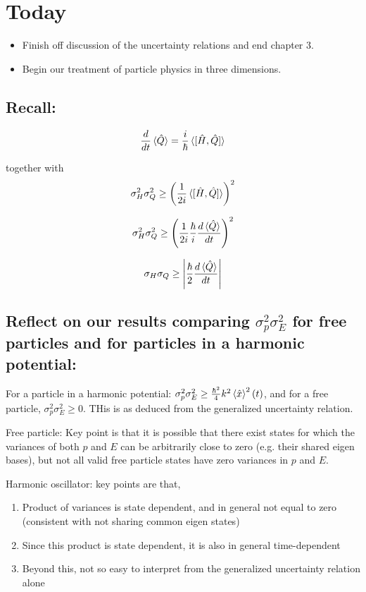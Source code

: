 \documentclass{article}
\begin{document}
\section{Today}

\begin{itemize}
    \item Finish off discussion of the uncertainty relations and end chapter 3. 
    \item Begin our treatment of particle physics in three dimensions. 
\end{itemize}

\hfill

\subsection*{Recall:}

$$\frac{d}{dt} \braket{\hat{Q}} = \frac{i}{\hbar} \braket{[\hat{H}, \hat{Q}]}$$

together with $$\sigma_H^2 \sigma_Q^2 \geq \left( \frac{1}{2i} \braket{[\hat{H}, \hat{Q}]} \right)^2$$

$$\sigma_H^2 \sigma_Q^2 \geq \left( \frac{1}{2i} \frac{\hbar}{i} \frac{d \braket{\hat{Q}}}{dt} \right)^2$$

$$\sigma_H \sigma_Q \geq \left|  \frac{\hbar}{2} \frac{d \braket{\hat{Q}}}{dt} \right|$$

\subsection*{Reflect on our results comparing $\sigma_p^2 \sigma_E^2$  for free particles and for particles in a harmonic potential:}

For a particle in a harmonic potential: $\sigma_p^2 \sigma_E^2 \geq \frac{\hbar^2}{4} k^2 \braket{\hat{x}}^2 (t)$, and for a free particle, $\sigma_p^2 \sigma_E^2 \geq 0$. THis is as deduced from the generalized uncertainty relation. 


Free particle: Key point is that it is possible that there exist states for which the variances of both $p$ and $E$ can be arbitrarily close to zero (e.g. their shared eigen bases), but not all valid free particle states have zero variances in $p$ and $E$. 


Harmonic oscillator: key points are that, 

\begin{enumerate}
    \item Product of variances is state dependent, and in general not equal to zero (consistent with not sharing common eigen states)
    \item Since this product is state dependent, it is also in general time-dependent
    \item Beyond this, not so easy to interpret from the generalized uncertainty relation alone
\end{enumerate}
\end{document}
